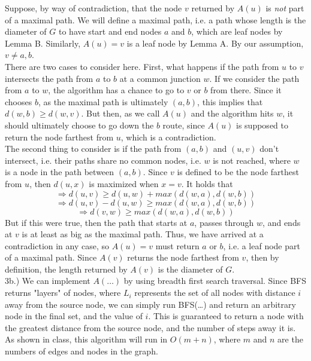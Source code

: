 \documentclass[12pt]{article}
\begin{document}
Suppose, by way of contradiction, that the node $v$ returned by $A(u)$ is \emph{not} part of a maximal path. We will define a maximal path, i.e. a path whose length is the diameter of $G$ to have start and end nodes $a$ and $b$, which are leaf nodes by Lemma B. Similarly, $A(u) = v$ is a leaf node by Lemma A. By our assumption, $v \neq a, b$.\\

There are two cases to consider here. First, what happens if the path from $u$ to $v$ intersects the path  from $a$ to $b$ at a common junction $w$. If we consider the path from $a$ to $w$, the algorithm has a chance to go to $v$ or $b$ from there. Since it chooses $b$, as the maximal path is ultimately $(a, b)$, this implies that $d(w, b) \geq d(w, v)$. But then, as we call $A(u)$ and the algorithm hits $w$, it should ultimately choose to go down the $b$ route, since $A(u)$ is supposed to return the node farthest from $u$, which is a contradiction.\\

The second thing to consider is if the path from $(a, b)$ and $(u, v)$ don't intersect, i.e. their paths share no common nodes, i.e. $w$ is not reached, where $w$ is a node in the path between $(a, b)$. Since $v$ is defined to be the node farthest from $u$, then $d(u, x)$ is maximized when $x = v$. It holds that
$$\Rightarrow d(u, v) \geq d(u, w) + max(d(w, a), d(w, b))$$
$$\Rightarrow d(u, v) - d(u, w) \geq max(d(w, a), d(w, b))$$
$$\Rightarrow d(v, w) \geq max(d(w, a), d(w, b))$$
But if this were true, then the path that starts at $a$, passes through $w$, and ends at $v$ is at least as big as the maximal path. Thus, we have arrived at a contradiction in any case, so $A(u) = v$ must return $a$ or $b$, i.e. a leaf node part of a maximal path. Since $A(v)$ returns the node farthest from $v$, then by definition, the length returned by $A(v)$ is the diameter of $G$.\\

3b.) We can implement $A(\dots)$ by using breadth first search traversal. Since BFS returns "layers" of nodes, where $L_i$ represents the set of all nodes with distance $i$ away from the source node, we can simply run BFS(\dots) and return an arbitrary node in the final set, and the value of $i$. This is guaranteed to return a node with the greatest distance from the source node, and the number of steps away it is. As shown in class, this algorithm will run in $O(m + n)$, where $m$ and $n$ are the numbers of edges and nodes in the graph.
\end{document}
